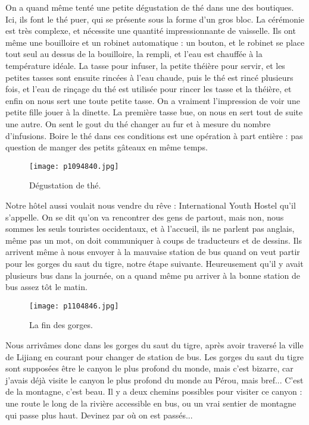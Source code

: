 \documentclass{book}
\begin{document}
On a quand même tenté une petite dégustation de thé dans une des boutiques. Ici, ils font le thé puer, qui se présente sous la forme d'un gros bloc. La cérémonie est très complexe, et nécessite une quantité impressionnante de vaisselle. Ils ont même une bouilloire et un robinet automatique : un bouton, et le robinet se place tout seul au dessus de la bouilloire, la rempli, et l'eau est chauffée à la température idéale. La tasse pour infuser, la petite théière pour servir, et les petites tasses sont ensuite rincées à l'eau chaude, puis le thé est rincé plusieurs fois, et l'eau de rinçage du thé est utilisée pour  rincer les tasse et la théière, et enfin on nous sert une toute petite tasse. On a vraiment l'impression de voir une petite fille jouer à la dinette. La première tasse bue, on nous en sert tout de suite une autre. On sent le gout du thé changer au fur et à mesure du nombre d'infusions. Boire le thé dans ces conditions est une opération à part entière : pas question de manger des petits gâteaux en même temps.


\begin{figure}[h]
\centering
\texttt{[image: p1094840.jpg]}
\caption*{Dégustation de thé.}
\end{figure}

Notre hôtel aussi voulait nous vendre du rêve : International Youth Hostel qu'il s'appelle. On se dit qu'on va rencontrer des gens de partout, mais non, nous sommes les seuls touristes occidentaux, et à l'accueil, ils ne parlent pas anglais, même pas un mot, on doit communiquer à coups de traducteurs et de dessins. Ils arrivent même à nous envoyer à la mauvaise station de bus quand on veut partir pour les gorges du saut du tigre, notre étape suivante. Heureusement qu'il y avait plusieurs bus dans la journée, on a quand même pu arriver à la bonne station de bus assez tôt le matin.


\begin{figure}[h]
\centering
\texttt{[image: p1104846.jpg]}
\caption*{La fin des gorges.}
\end{figure}



Nous arrivâmes donc dans les gorges du saut du tigre, après avoir traversé la ville de Lijiang en courant pour changer de station de bus. Les gorges du saut du tigre sont supposées être le canyon le plus profond du monde, mais c'est bizarre, car j'avais déjà visite le canyon le plus profond du monde au Pérou, mais bref... C'est de la montagne, c'est beau. Il y a deux chemins possibles pour visiter ce canyon : une route le long de la rivière accessible en bus, ou un vrai sentier de montagne qui passe plus haut. Devinez par où on est passés...
\end{document}
